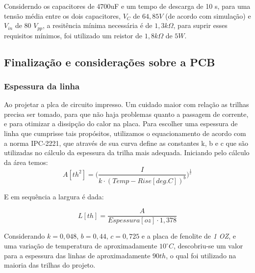 \documentclass[a4paper,12pt,oneside,openany,table,xcdraw]{article}
\begin{document}
Considerndo os capacitores de 4700uF e um tempo de descarga de 10 s, para uma tensão média entre os dois capacitores, $V_{C}$ de $64,85 V$ (de acordo com simulação) e $V_{in}$ de 80 $V_{pp}$, a resitência mínima necessária é de $1,3 k\Omega$, para suprir esses requisitos mínimos, foi utilizado um reistor de $1,8 k\Omega$ de $5W$. 



\vspace{0.3cm}
\subsection{Finalização e considerações sobre a PCB}

\subsubsection{Espessura da linha}
Ao projetar a plca de circuito impresso. Um cuidado maior com relação as trilhas precisa ser tomado, para que não haja problemas quanto a passagem de corrente, e para otimizar a dissipção do calor na placa. 
Para escolher uma espessura de linha que cumprisse tais propósitos, utilizamos o equacionamento de acordo com a norma IPC-2221, que através de sua curva define as constantes k, b e c que são utilizadas no cálculo da espessura da trilha mais adequada.
Iniciando pelo cálculo da área temos:
\begin{equation}
A [\mathit{th^{2}}] = \Bigg(\dfrac{I}{k \cdot (Temp-Rise [deg. C])^{b}}\Bigg)^{\frac{1}{c}}
 \end{equation}
 \vspace{0.3cm}

E em sequência a largura é dada:

\begin{equation}
L [\mathit{th}] = \dfrac{A}{Espessura [oz] \cdot 1,378}
 \end{equation}
\vspace{0.3cm}

Considerando  $k = 0,048$, $b = 0,44$, $c = 0,725$ e a placa de fenolite de \emph{1 OZ}, e uma variação de temperatura de aproximadamente $10^{\circ}C$, descobriu-se um valor para a espessura das linhas de aproximadamente $90 th$, o qual foi utilizado na maioria das trilhas do projeto.

\vspace{0.2cm}
\end{document}

